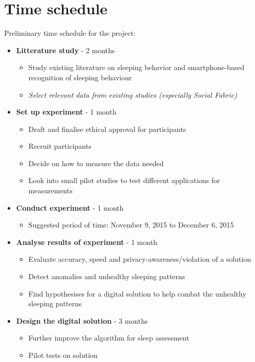 \documentclass[12pt]{article}
\begin{document}
\section{Time schedule}
Preliminary time schedule for the project:
	\begin{itemize}
		\item \textbf{Litterature study} - 2 months
			\begin{itemize}
				\item Study existing literature on sleeping behavior and smartphone-based recognition of sleeping behaviour
				\item \textit{Select relevant data from existing studies (especially Social Fabric)}
			\end{itemize}	
		\item \textbf{Set up experiment} - 1 month
			\begin{itemize}
				\item Draft and finalise ethical approval for participants 
				\item Recruit participants
				\item Decide on how to measure the data needed
				\item Look into small pilot studies to test different applications for measurements
			\end{itemize}	
		\item \textbf{Conduct experiment} - 1 month
			\begin{itemize}
				\item Suggested period of time: November 9, 2015 to December 6, 2015
			\end{itemize}	
		\item \textbf{Analyse results of experiment} - 1 month
			\begin{itemize}
				\item Evaluate accuracy, speed and privacy-awareness/violation of a solution
				\item Detect anomalies and unhealthy sleeping patterns
				\item Find hypothesises for a digital solution to help combat the unhealthy sleeping 
				patterns   
			\end{itemize}	
		\item \textbf{Design the digital solution} - 3 months 
			\begin{itemize}
				\item Further improve the algorithm for sleep assessment 
				\item Pilot tests on solution 
			\end{itemize}	

\end{itemize}
\end{document}
